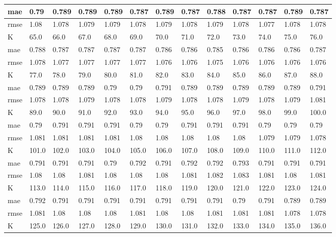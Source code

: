 \begin{appendices}
\begin{center}
\begin{tabularx}{\textwidth}{|l|X|X|X|X|X|X|X|X|X|X|X|X|}
		mae & 0.79 & 0.789 & 0.789 & 0.789 & 0.787 & 0.789 & 0.787 & 0.788 & 0.787 & 0.787 & 0.789 & 0.787 \\ \hline 
		rmse & 1.08 & 1.078 & 1.079 & 1.079 & 1.078 & 1.079 & 1.078 & 1.079 & 1.078 & 1.077 & 1.078 & 1.078 \\ \hline 
		\hline 
		K & 65.0 & 66.0 & 67.0 & 68.0 & 69.0 & 70.0 & 71.0 & 72.0 & 73.0 & 74.0 & 75.0 & 76.0 \\ \hline 
		mae & 0.788 & 0.787 & 0.787 & 0.787 & 0.787 & 0.786 & 0.786 & 0.785 & 0.786 & 0.786 & 0.786 & 0.787 \\ \hline 
		rmse & 1.078 & 1.077 & 1.077 & 1.077 & 1.077 & 1.076 & 1.076 & 1.075 & 1.076 & 1.076 & 1.076 & 1.076 \\ \hline 
		\hline 
		K & 77.0 & 78.0 & 79.0 & 80.0 & 81.0 & 82.0 & 83.0 & 84.0 & 85.0 & 86.0 & 87.0 & 88.0 \\ \hline 
		mae & 0.789 & 0.789 & 0.789 & 0.79 & 0.79 & 0.791 & 0.789 & 0.789 & 0.789 & 0.789 & 0.789 & 0.791 \\ \hline 
		rmse & 1.078 & 1.078 & 1.079 & 1.078 & 1.078 & 1.079 & 1.078 & 1.078 & 1.079 & 1.078 & 1.079 & 1.081 \\ \hline 
		\hline 
		K & 89.0 & 90.0 & 91.0 & 92.0 & 93.0 & 94.0 & 95.0 & 96.0 & 97.0 & 98.0 & 99.0 & 100.0 \\ \hline 
		mae & 0.79 & 0.791 & 0.791 & 0.791 & 0.79 & 0.79 & 0.791 & 0.791 & 0.791 & 0.79 & 0.79 & 0.79 \\ \hline 
		rmse & 1.081 & 1.081 & 1.081 & 1.081 & 1.08 & 1.08 & 1.08 & 1.08 & 1.08 & 1.079 & 1.079 & 1.078 \\ \hline 
		\hline 
		K & 101.0 & 102.0 & 103.0 & 104.0 & 105.0 & 106.0 & 107.0 & 108.0 & 109.0 & 110.0 & 111.0 & 112.0 \\ \hline 
		mae & 0.791 & 0.791 & 0.791 & 0.79 & 0.792 & 0.791 & 0.792 & 0.792 & 0.793 & 0.791 & 0.791 & 0.791 \\ \hline 
		rmse & 1.08 & 1.08 & 1.081 & 1.08 & 1.08 & 1.08 & 1.081 & 1.082 & 1.083 & 1.081 & 1.08 & 1.081 \\ \hline 
		\hline 
		K & 113.0 & 114.0 & 115.0 & 116.0 & 117.0 & 118.0 & 119.0 & 120.0 & 121.0 & 122.0 & 123.0 & 124.0 \\ \hline 
		mae & 0.792 & 0.791 & 0.791 & 0.791 & 0.791 & 0.791 & 0.791 & 0.791 & 0.79 & 0.791 & 0.789 & 0.789 \\ \hline 
		rmse & 1.081 & 1.08 & 1.08 & 1.08 & 1.081 & 1.08 & 1.08 & 1.081 & 1.081 & 1.081 & 1.078 & 1.078 \\ \hline 
		\hline 
		K & 125.0 & 126.0 & 127.0 & 128.0 & 129.0 & 130.0 & 131.0 & 132.0 & 133.0 & 134.0 & 135.0 & 136.0 \\ \hline 

\end{tabularx}
\end{center}
\end{appendices}
